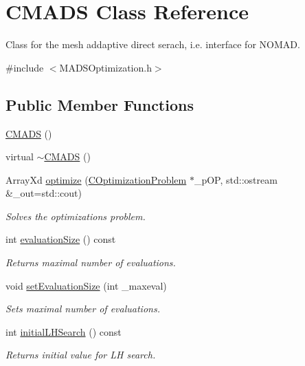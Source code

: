 \hypertarget{class_c_m_a_d_s}{\section{C\-M\-A\-D\-S Class Reference}
\label{class_c_m_a_d_s}
}


Class for the mesh addaptive direct serach, i.\-e. interface for N\-O\-M\-A\-D.  




{\ttfamily \#include $<$M\-A\-D\-S\-Optimization.\-h$>$}

\subsection*{Public Member Functions}
\begin{DoxyCompactItemize}
\item 
\hyperlink{class_c_m_a_d_s_a80e31199addf50b5d34bd3aeb7812521}{C\-M\-A\-D\-S} ()
\item 
virtual \hyperlink{class_c_m_a_d_s_af43c613be3091d5ce2523fd21048574a}{$\sim$\-C\-M\-A\-D\-S} ()
\item 
Array\-Xd \hyperlink{class_c_m_a_d_s_a952faa93a4f38ca237dad46d8fec929e}{optimize} (\hyperlink{class_c_optimization_problem}{C\-Optimization\-Problem} $\ast$\-\_\-p\-O\-P, std\-::ostream \&\-\_\-out=std\-::cout)
\begin{DoxyCompactList}\small\item\em Solves the optimizations problem. \end{DoxyCompactList}\item 
int \hyperlink{class_c_m_a_d_s_ad8a920109cf781c8dadca57983f3122f}{evaluation\-Size} () const 
\begin{DoxyCompactList}\small\item\em Returns maximal number of evaluations. \end{DoxyCompactList}\item 
void \hyperlink{class_c_m_a_d_s_ac532678117eb81760fb20a90abaf4f5e}{set\-Evaluation\-Size} (int \-\_\-maxeval)
\begin{DoxyCompactList}\small\item\em Sets maximal number of evaluations. \end{DoxyCompactList}\item 
int \hyperlink{class_c_m_a_d_s_a1cfffca12bdc69f981414c869d80b37c}{initial\-L\-H\-Search} () const 
\begin{DoxyCompactList}\small\item\em Returns initial value for L\-H search. \end{DoxyCompactList}\item 

\end{DoxyCompactItemize}
